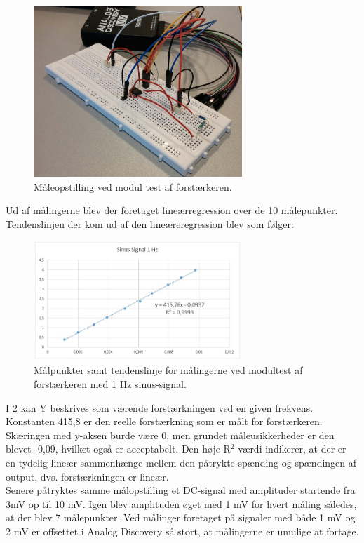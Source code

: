 \begin{figure}[H]
	\centering
	\includegraphics[width=0.7\textwidth]{Figurer/Hardware/ForstaerkerTest}
	\caption{Måleopstilling ved modul test af forstærkeren.}
	\label{fig:ForstaerkerTest}
\end{figure}

Ud af målingerne blev der foretaget lineærregression over de 10 målepunkter. Tendenslinjen der kom ud af den lineæreregression blev som følger:

\begin{figure}[H]
	\centering
	\includegraphics[width=0.7\textwidth]{Figurer/Hardware/Sinusforstaerker}
	\caption{Målpunkter samt tendenslinje for målingerne ved modultest af forstærkeren med 1 Hz sinus-signal.}
	\label{fig:SinusModul}
\end{figure}


I \ref{fig:SinusModul} kan Y beskrives som værende forstærkningen ved en given frekvens. Konstanten 415,8 er den reelle forstærkning som er målt for forstærkeren. Skæringen med y-aksen burde være 0, men grundet måleusikkerheder er den blevet -0,09, hvilket også er acceptabelt. Den høje R$^2$ værdi indikerer, at der er en tydelig lineær sammenhænge mellem den påtrykte spænding og spændingen af output, dvs. forstærkningen er lineær.\\[1ex]
Senere påtryktes samme målopstilling et DC-signal med amplituder startende fra 3mV op til 10 mV. Igen blev amplituden øget med 1 mV for hvert måling således, at der blev 7 målepunkter. Ved målinger foretaget på signaler med både 1 mV og 2 mV er offsettet i Analog Discovery så stort, at målingerne er umulige at fortage.

